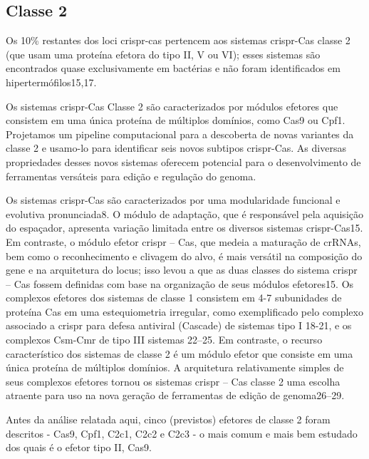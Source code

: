 \documentclass{report}
\begin{document}
\par

\subsection{Classe 2}

Os 10\% restantes dos loci \ac{crispr}-cas pertencem aos sistemas \ac{crispr}-Cas classe 2 (que usam uma proteína efetora do tipo II, V ou VI); esses sistemas são encontrados quase exclusivamente em bactérias e não foram identificados em hipertermófilos15,17.

Os sistemas \ac{crispr}-Cas Classe 2 são caracterizados por módulos efetores que consistem em uma única proteína de múltiplos domínios, como Cas9 ou Cpf1. Projetamos um pipeline computacional para a descoberta de novas variantes da classe 2 e usamo-lo para identificar seis novos subtipos \ac{crispr}-Cas. As diversas propriedades desses novos sistemas oferecem potencial para o desenvolvimento de ferramentas versáteis para edição e regulação do genoma.\par
Os sistemas \ac{crispr}-Cas são caracterizados por uma modularidade funcional e evolutiva pronunciada8. O módulo de adaptação, que é responsável pela aquisição do espaçador, apresenta variação limitada entre os diversos sistemas \ac{crispr}-Cas15. Em contraste, o módulo efetor \ac{crispr} – Cas, que medeia a maturação de crRNAs, bem como o reconhecimento e clivagem do alvo, é mais versátil na composição do gene e na arquitetura do locus; isso levou a que as duas classes do sistema \ac{crispr} – Cas fossem definidas com base na organização de seus módulos efetores15. Os complexos efetores dos sistemas de classe 1 consistem em 4-7 subunidades de proteína Cas em uma estequiometria irregular, como exemplificado pelo complexo associado a \ac{crispr} para defesa antiviral (Cascade) de sistemas tipo I 18-21, e os complexos Csm-Cmr de tipo III sistemas 22–25. Em contraste, o recurso característico dos sistemas de classe 2 é um módulo efetor que consiste em uma única proteína de múltiplos domínios. A arquitetura relativamente simples de seus complexos efetores tornou os sistemas \ac{crispr} – Cas classe 2 uma escolha atraente para uso na nova geração de ferramentas de edição de genoma26–29.

Antes da análise relatada aqui, cinco (previstos) efetores de classe 2 foram descritos - Cas9, Cpf1, C2c1, C2c2 e C2c3 - o mais comum e mais bem estudado dos quais é o efetor tipo II, Cas9.
\end{document}
